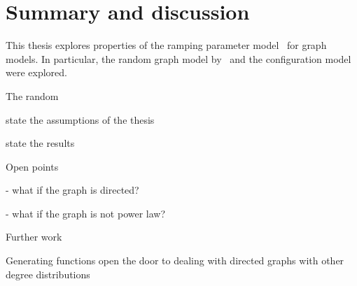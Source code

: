 \chapter{Summary and discussion} %
\label{cha:discussion}

This thesis explores properties of the ramping parameter model~\cite{Sindel:2009} for graph models.
In particular, the random graph model by~\cite{} and the configuration model were explored.


The random 



state the assumptions of the thesis

state the results

Open points

- what if the graph is directed?

- what if the graph is not power law?



Further work


Generating functions open the door to dealing with directed graphs with other degree distributions







